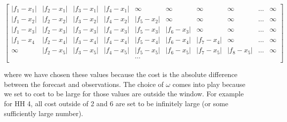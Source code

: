 \documentclass[a4paper]{article}
\begin{document}
\centerline{$\begin{bmatrix}
    |f_1 - x_1| & |f_2 - x_1| & |f_3 - x_1| & |f_4 - x_1|  & \infty& \infty& \infty &\infty & \dots & \infty \\
    |f_1 - x_2| & |f_2 - x_2| & |f_3 - x_2| &  |f_4 - x_2| & |f_5 - x_2| & \infty  &\infty & \infty & \dots & \infty\\
    |f_1 - x_3| & |f_2 - x_3| & |f_3 - x_3| &  |f_4 - x_3|& |f_5- x_3|& |f_6 - x_3| & \infty&\infty & \dots  & \infty\\
    |f_1 - x_4 & |f_2 - x_4| & |f_3 - x_4| & |f_4 - x_4| &  |f_5 - x_4|& |f_6- x_4|& |f_7 - x_4| & \infty&\dots & \infty\\
    \infty & |f_2 - x_5| & |f_3 - x_5| & |f_4 - x_5| &  |f_5 - x_5|& |f_6- x_5|& |f_7 - x_5| & |f_8 -x_5|&\dots & \infty\\
   &&&& \dots &&&&& \\
\end{bmatrix}$}

\noindent where we have chosen these values because the cost is the absolute difference between the forecast and observations. The choice of $\omega$ comes into play because we set to cost to be large for those values are outside the window. For example for HH 4, all cost outside of 2 and 6 are set to be infinitely large (or some sufficiently large number).
\end{document}
